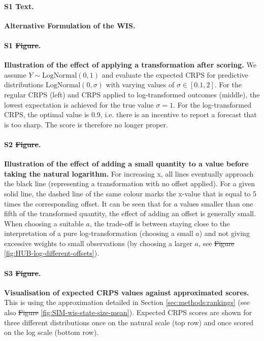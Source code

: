 \documentclass[10pt,letterpaper]{article} %
\providecommand{\DIFaddtex}[1]{{\protect\color{blue}\uwave{#1}}} %
\providecommand{\DIFdeltex}[1]{{\protect\color{red}\sout{#1}}}                      %
\providecommand{\DIFaddbegin}{} %
\providecommand{\DIFaddend}{} %
\providecommand{\DIFdelbegin}{} %
\providecommand{\DIFdelend}{} %
\providecommand{\DIFadd}[1]{\texorpdfstring{\DIFaddtex{#1}}{#1}} %
\providecommand{\DIFdel}[1]{\texorpdfstring{\DIFdeltex{#1}}{}} %
\newcommand{\DIFscaledelfig}{0.5}
\newlength{\DIFdelgraphicswidth} %
\newlength{\DIFdelgraphicsheight} %
\newcommand{\DIFaddincludegraphics}[2][]{{\color{blue}\fbox{\DIFOincludegraphics[#1]{#2}}}} %
\newcommand{\DIFdelincludegraphics}[2][]{%
\sbox{\DIFdelgraphicsbox}{\DIFOincludegraphics[#1]{#2}}%
\settoboxwidth{\DIFdelgraphicswidth}{\DIFdelgraphicsbox} %
\settoboxtotalheight{\DIFdelgraphicsheight}{\DIFdelgraphicsbox} %
\scalebox{\DIFscaledelfig}{%
\parbox[b]{\DIFdelgraphicswidth}{\usebox{\DIFdelgraphicsbox}\\[-\baselineskip] \rule{\DIFdelgraphicswidth}{0em}}\llap{\resizebox{\DIFdelgraphicswidth}{\DIFdelgraphicsheight}{%
\setlength{\unitlength}{\DIFdelgraphicswidth}%
\begin{picture}(1,1)%
\thicklines\linethickness{2pt} %
{\color[rgb]{1,0,0}\put(0,0){\framebox(1,1){}}}%
{\color[rgb]{1,0,0}\put(0,0){\line( 1,1){1}}}%
{\color[rgb]{1,0,0}\put(0,1){\line(1,-1){1}}}%
\end{picture}%
}\hspace*{3pt}}} %
} %
\DeclareRobustCommand{\DIFaddbegin}{\DIFOaddbegin \let\includegraphics\DIFaddincludegraphics} %
\DeclareRobustCommand{\DIFaddend}{\DIFOaddend \let\includegraphics\DIFOincludegraphics} %
\DeclareRobustCommand{\DIFdelbegin}{\DIFOdelbegin \let\includegraphics\DIFdelincludegraphics} %
\DeclareRobustCommand{\DIFdelend}{\DIFOaddend \let\includegraphics\DIFOincludegraphics} %
\begin{document}
\renewcommand{\thefigure}{SI.\arabic{figure}}
\setcounter{figure}{0}
\renewcommand{\thetable}{SI.\arabic{table}} \setcounter{table}{0}


\paragraph{S1 Text.}
\label{sec:alternative-wis}
\textbf{Alternative Formulation of the WIS.}

\paragraph{S1 \DIFdelbegin \DIFdel{Figure}\DIFdelend \DIFaddbegin \DIFadd{Fig}\DIFaddend .}
\label{fig:log-improper}
\textbf{Illustration of the effect of applying a transformation after scoring. }
We assume $Y \sim \text{LogNormal}(0, 1)$ and evaluate the expected CRPS for predictive distributions $\text{LogNormal}(0, \sigma)$ with varying values of $\sigma \in [0.1, 2]$. For the regular CRPS (left) and CRPS applied to log-transformed outcomes (middle), the lowest expectation is achieved for the true value $\sigma = 1$. For the log-transformed CRPS, the optimal value is  0.9, i.e. there is an incentive to report a forecast that is too sharp. The score is therefore no longer proper.

\paragraph{S2 \DIFdelbegin \DIFdel{Figure}\DIFdelend \DIFaddbegin \DIFadd{Fig}\DIFaddend .}
\label{fig:illustration-effect-log-offset}
\textbf{Illustration of the effect of adding a small quantity to a value before taking the natural logarithm. }
For increasing x, all lines eventually approach the black line (representing a transformation with no offset applied).
    For a given solid line, the dashed line of the same colour marks the x-value that  is equal to 5 times the corresponding offset. It can be seen that for $a$ values smaller than one fifth of the transformed quantity, the effect of adding an offset is generally small. When choosing a suitable $a$, the trade-off is between staying close to the interpretation of a pure log-transformation (choosing a small $a$) and not giving excessive weights to small observations (by choosing a larger $a$, see \DIFdelbegin \DIFdel{Figure }\DIFdelend \DIFaddbegin \DIFadd{Fig }\DIFaddend \ref{fig:HUB-log-different-offsets}).

\paragraph{S3 \DIFdelbegin \DIFdel{Figure}\DIFdelend \DIFaddbegin \DIFadd{Fig}\DIFaddend .}
\label{fig:score-approx}
\textbf{Visualisation of expected CRPS values against approximated scores.} 
This is using the approximation detailed in Section \ref{sec:methods:rankings} (see also \DIFdelbegin \DIFdel{Figure }\DIFdelend \DIFaddbegin \DIFadd{Fig }\DIFaddend \ref{fig:SIM-wis-state-size-mean}). Expected CRPS scores are shown for three different distributions once on the natural scale (top row) and once scored on the log scale (bottom row). 
\end{document}
